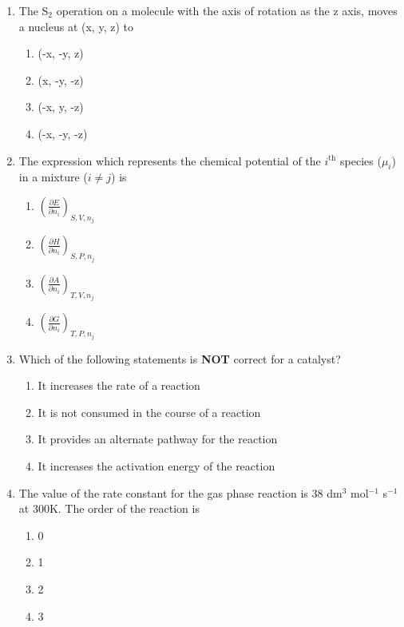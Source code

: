\documentclass[journal,12pt,onecolumn]{IEEEtran}
\theoremstyle{remark}
\begin{document}
\begin{enumerate}
\item The S$_2$ operation on a molecule with the axis of rotation as the z axis, moves a nucleus at (x, y, z) to \hfill{}
\begin{multicols}{2}
\begin{enumerate}[leftmargin=*,labelsep=1em]
     \item   (-x, -y, z)
     \item   (x, -y, -z)
     \item   (-x, y, -z)
     \item   (-x, -y, -z)
\end{enumerate}
\end{multicols}
 

\item The expression which represents the chemical potential of the $i^{\text{th}}$ species ($\mu_i$) in a mixture ($i \ne j$) is \hfill{}
\begin{multicols}{2}
\begin{enumerate}[leftmargin=*,labelsep=1em]
     \item   $\left( \frac{\partial E}{\partial n_i} \right)_{S,V,n_j}$
     \item   $\left( \frac{\partial H}{\partial n_i} \right)_{S,P,n_j}$
     \item   $\left( \frac{\partial A}{\partial n_i} \right)_{T,V,n_j}$
     \item   $\left( \frac{\partial G}{\partial n_i} \right)_{T,P,n_j}$
\end{enumerate}
\end{multicols}
 

\item Which of the following statements is \textbf{NOT} correct for a catalyst? \hfill{}
\begin{multicols}{2}
\begin{enumerate}[leftmargin=*,labelsep=1em]
     \item   It increases the rate of a reaction
     \item   It is not consumed in the course of a reaction
     \item   It provides an alternate pathway for the reaction
     \item   It increases the activation energy of the reaction
\end{enumerate}
\end{multicols}
  

\item The value of the rate constant for the gas phase reaction  is 38 dm$^{3}$ mol$^{-1}$ s$^{-1}$ at 300K. The order of the reaction is \hfill{}
\begin{multicols}{2}
\begin{enumerate}[leftmargin=*,labelsep=1em]
     \item   0
     \item   1
     \item   2
     \item   3
\end{enumerate}
\end{multicols}


\end{enumerate}
\end{document}
